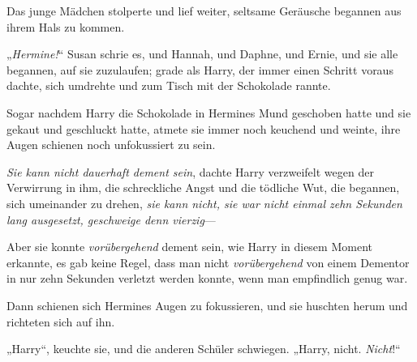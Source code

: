 Das junge Mädchen stolperte und lief weiter, seltsame Geräusche begannen aus ihrem Hals zu kommen.

„\emph{Hermine!}“ Susan schrie es, und Hannah, und Daphne, und Ernie, und sie alle begannen, auf sie zuzulaufen; grade als Harry, der immer einen Schritt voraus dachte, sich umdrehte und zum Tisch mit der Schokolade rannte.

Sogar nachdem Harry die Schokolade in Hermines Mund geschoben hatte und sie gekaut und geschluckt hatte, atmete sie immer noch keuchend und weinte, ihre Augen schienen noch unfokussiert zu sein.

\emph{Sie kann nicht dauerhaft dement sein}, dachte Harry verzweifelt wegen der Verwirrung in ihm, die schreckliche Angst und die tödliche Wut, die begannen, sich umeinander zu drehen, \emph{sie kann nicht, sie war nicht einmal zehn Sekunden lang ausgesetzt, geschweige denn vierzig}—

Aber sie konnte \emph{vorübergehend} dement sein, wie Harry in diesem Moment erkannte, es gab keine Regel, dass man nicht \emph{vorübergehend} von einem Dementor in nur zehn Sekunden verletzt werden konnte, wenn man empfindlich genug war.

Dann schienen sich Hermines Augen zu fokussieren, und sie huschten herum und richteten sich auf ihn.

„Harry“, keuchte sie, und die anderen Schüler schwiegen. „Harry, nicht. \emph{Nicht}!“

